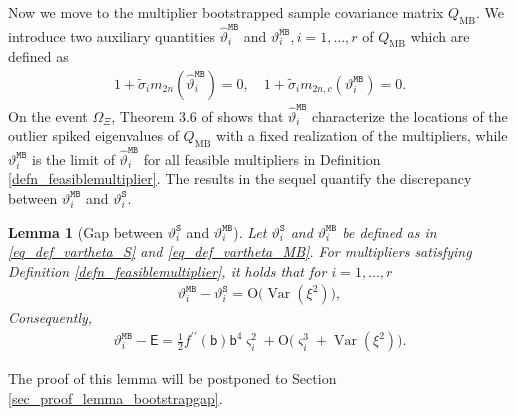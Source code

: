 \documentclass[12pt]{article}
\theoremstyle{plain}
\newtheorem{lemma}{Lemma}[section]
\numberwithin{equation}{section}
\begin{document}
Now we move to the multiplier bootstrapped sample covariance matrix $Q_{\mathrm{MB}}$. We introduce two auxiliary quantities $\widehat{\vartheta}^{\mathtt{MB}}_i$ and $\vartheta^{\mathtt{MB}}_i, i=1,\dots, r$ of $Q_{\mathrm{MB}}$ which are defined as
\begin{align}\label{eq_def_vartheta_MB}
	1+\widetilde{\sigma}_im_{2n}(\widehat{\vartheta}^{\mathtt{MB}}_i)=0,\quad 1+\widetilde{\sigma}_im_{2n,c}(\vartheta^{\mathtt{MB}}_i)=0.
\end{align}
On the event $\Omega_{\Xi}$, Theorem 3.6 of \citet{DingYang2021} shows that $\widehat{\vartheta}^{\mathtt{MB}}_i$ characterize the locations of the outlier spiked eigenvalues of $Q_{\mathrm{MB}}$ with a fixed realization of the multipliers, while $\vartheta^{\mathtt{MB}}_i$ is the limit of $\widehat{\vartheta}^{\mathtt{MB}}_i$ for all feasible multipliers in Definition \ref{defn_feasiblemultiplier}. The results in the sequel quantify the discrepancy between $\vartheta^{\mathtt{MB}}_i$  and $\vartheta_i^{\mathtt{S}}$.
\begin{lemma}[Gap between $\vartheta_i^{\mathtt{S}}$ and $\vartheta^{\mathtt{MB}}_i$]\label{lem_power_bootstrap_gap}
	Let $\vartheta_i^{\mathtt{S}}$ and $\vartheta^{\mathtt{MB}}_i$ be defined as in \eqref{eq_def_vartheta_S} and \eqref{eq_def_vartheta_MB}. For multipliers satisfying Definition \ref{defn_feasiblemultiplier}, it holds that for $i=1,\dots, r$
	\begin{align}\label{eq_power_gap}
		\vartheta^{\mathtt{MB}}_i-\vartheta_i^{\mathtt{S}}
		=
		\mathrm{O}\big(\operatorname{Var}(\xi^2)\big),
	\end{align}
	Consequently,
	\begin{align}\label{eq_power_theta_c_gap}
		\vartheta^{\mathtt{MB}}_i-\mathsf E
		=\frac{1}{2}f^{\prime\prime}(\mathsf{b})\mathsf{b}^4\varsigma_i^2+
		\mathrm{O}\big(\varsigma_i^3+\operatorname{Var}(\xi^2)\big).
	\end{align}
\end{lemma}
The proof of this lemma will be postponed to Section \ref{sec_proof_lemma_bootstrapgap}.
\end{document}
